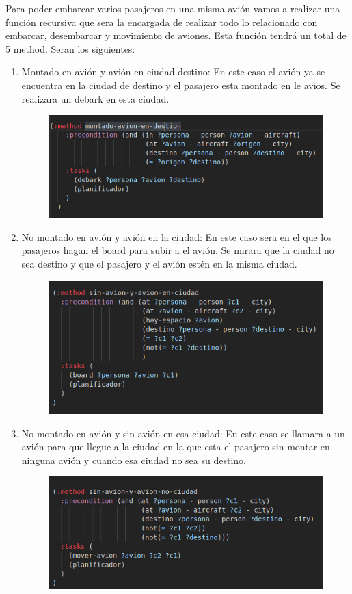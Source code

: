 \documentclass[]{article}
\begin{document}
Para poder embarcar varios pasajeros en una misma avión vamos a realizar una función recursiva que sera la encargada de realizar todo lo relacionado con embarcar, desembarcar y movimiento de aviones. Esta función tendrá un total de 5 method. Seran los siguientes: 
\begin{enumerate}
	\item Montado en avión y avión en ciudad destino: En este caso el avión ya se encuentra en la ciudad de destino y el pasajero esta montado en le avios. Se realizara un debark en esta ciudad.
	\begin{figure}[H]
		\centering
		\includegraphics[width=0.7\linewidth]{screenshot011}
		\caption{}
		\label{fig:screenshot011}
	\end{figure}
	
	\item No montado en avión y avión en la ciudad: En este caso sera en el que los pasajeros hagan el board para subir a el avión. Se mirara que la ciudad no sea destino y que el pasajero y el avión estén en la misma ciudad.	
	\begin{figure}[H]
		\centering
		\includegraphics[width=0.7\linewidth]{screenshot012}
		\caption{}
		\label{fig:screenshot012}
	\end{figure}
	
	\item No montado en avión y sin avión en esa ciudad: En este caso se llamara a un avión para que llegue a la ciudad en la que esta el pasajero sin montar en ninguna avión y cuando esa ciudad no sea su destino.
	\begin{figure}[H]
		\centering
		\includegraphics[width=0.7\linewidth]{screenshot015}
		\caption{}
		\label{fig:screenshot015}
	\end{figure}
	

\end{enumerate}
\end{document}
